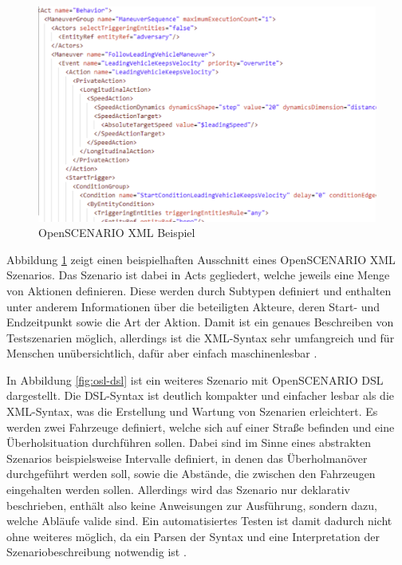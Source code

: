 \begin{figure}[h]
    \centering
    \includegraphics[width=0.85\linewidth]{contents/figures/openscenario_xml.png}
    \caption{OpenSCENARIO XML Beispiel \cite{EinfuehrungIntegrationsprojekt}}
    \label{fig:osl-xml}
\end{figure}

Abbildung \ref{fig:osl-xml} zeigt einen beispielhaften Ausschnitt eines OpenSCENARIO XML Szenarios.
Das Szenario ist dabei in \glqq Acts\grqq{} gegliedert, welche jeweils eine Menge von Aktionen definieren.
Diese werden durch Subtypen definiert und enthalten unter anderem Informationen über die beteiligten Akteure, deren Start- und Endzeitpunkt sowie die Art der Aktion.
Damit ist ein genaues Beschreiben von Testszenarien möglich, allerdings ist die XML-Syntax sehr umfangreich und für Menschen unübersichtlich, dafür aber einfach maschinenlesbar \cite{EinfuehrungIntegrationsprojekt}.



In Abbildung \ref{fig:osl-dsl} ist ein weiteres Szenario mit OpenSCENARIO DSL dargestellt.
Die DSL-Syntax ist deutlich kompakter und einfacher lesbar als die XML-Syntax, was die Erstellung und Wartung von Szenarien erleichtert.
Es werden zwei Fahrzeuge definiert, welche sich auf einer Straße befinden und eine Überholsituation durchführen sollen.
Dabei sind im Sinne eines abstrakten Szenarios beispielsweise Intervalle definiert, in denen das Überholmanöver durchgeführt werden soll, sowie die Abstände, die zwischen den Fahrzeugen eingehalten werden sollen.
Allerdings wird das Szenario nur deklarativ beschrieben, enthält also keine Anweisungen zur Ausführung, sondern dazu, welche Abläufe valide sind.
Ein automatisiertes Testen ist damit dadurch nicht ohne weiteres möglich, da ein Parsen der Syntax und eine Interpretation der Szenariobeschreibung notwendig ist \cite{EinfuehrungIntegrationsprojekt}. 

